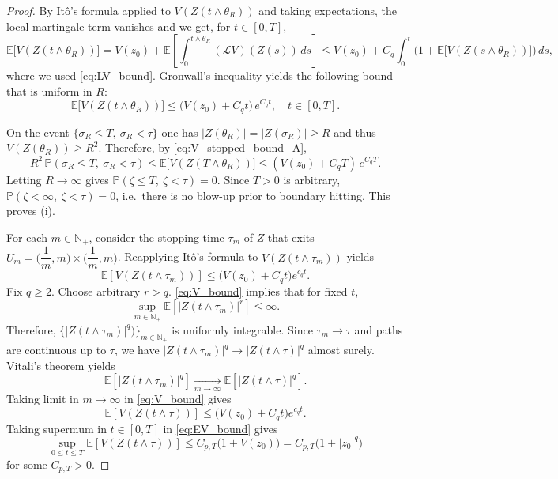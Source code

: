 \documentclass[pdflatex,sn-mathphys-ay]{sn-jnl}
\theoremstyle{thmstyleone}
\theoremstyle{definition}
\theoremstyle{remark}
\begin{document}
\begin{appendices}
\begin{proof}
By It\^{o}'s formula applied to $V(Z(t\wedge \theta_R))$ and taking expectations,
the local martingale term vanishes and we get, for $t\in[0,T]$,
\[
\mathbb{E}\bigl[V(Z(t\wedge \theta_R))\bigr]
=
V(z_0)+\mathbb{E}\!\left[\int_0^{t\wedge \theta_R} (\mathcal{L}V)(Z(s))\,ds\right]
\le
V(z_0)+C_q\int_0^t \Big( 1 +   \mathbb{E}\bigl[V(Z(s\wedge \theta_R))\bigr] \Big)\,ds,
\]
where we used \eqref{eq:LV_bound}.
Gronwall's inequality yields the following bound that is uniform in $R$:
\begin{equation}\label{eq:V_stopped_bound_A}
\mathbb{E}\bigl[V(Z(t\wedge \theta_R))\bigr]
\le
\big(V(z_0) + C_q t \big)\,e^{C_qt}, \quad t\in [0,T].
\end{equation}

On the event $\{\sigma_R\le T,\ \sigma_R<\tau\}$ one has $|Z(\theta_R)|=|Z(\sigma_R)|\ge R$ and thus
$V(Z(\theta_R))\ge R^2$. Therefore, by \eqref{eq:V_stopped_bound_A},
\[
R^2\,\mathbb{P}(\sigma_R\le T,\ \sigma_R<\tau)
\le
\mathbb{E}\bigl[V(Z(T\wedge \theta_R))\bigr]
\le
(V(z_0)+C_qT)\,e^{C_qT}.
\]
Letting $R\to\infty$ gives $\mathbb{P}(\zeta\le T,\ \zeta<\tau)=0$. Since $T>0$ is arbitrary,
$\mathbb{P}(\zeta<\infty,\ \zeta<\tau)=0$, i.e.\ there is no blow-up prior to boundary hitting.
This proves (i).

For each $m\in \mathbb{N}_+$, consider the stopping time $\tau_m$ of $Z$ that exits $U_m = \bigg(\dfrac{1}{m}, m\bigg) \times \bigg( \dfrac{1}{m}, m\bigg)$.
Reapplying It\^o's formula to $V(Z(t\wedge \tau_m))$ yields 
\begin{equation}\label{eq:V_bound}
    \mathbb{E}\left[V(Z(t\wedge \tau_m))\right] \le \big( V(z_0) + C_qt\big) e^{c_qt}.
\end{equation}
Fix $q\ge 2$. Choose arbitrary $r>q$. \eqref{eq:V_bound} implies that for fixed $t$,
\begin{equation*}
    \sup_{m\in \mathbb{N}_+} \mathbb{E}\left[\lvert Z(t\wedge \tau_m)\rvert ^r \right] \le \infty.
\end{equation*}
Therefore, $\{\lvert Z(t\wedge \tau_m)\rvert^q)\}_{m\in \mathbb{N}_+}$ is uniformly integrable. 
Since $\tau_m \to \tau$ and paths are continuous up to $\tau$, we have $\lvert Z(t\wedge \tau_m)\rvert^q \to \lvert Z(t\wedge \tau)\rvert^q$ almost surely. Vitali's theorem yields
\begin{equation*}
    \mathbb{E}\left[\lvert Z(t\wedge \tau_m)\rvert^q \right] \underset{m\to\infty}{\longrightarrow}
    \mathbb{E}\left[\lvert Z(t\wedge \tau)\rvert^q \right].
\end{equation*}
Taking limit in $m\to \infty$ in \eqref{eq:V_bound} gives
\begin{equation}\label{eq:EV_bound}
    \mathbb{E}\left[V(Z(t\wedge \tau))\right] \le \big( V(z_0) + C_qt\big) e^{c_qt}.
\end{equation}
Taking supermum in $t\in [0,T]$ in \eqref{eq:EV_bound} gives
\begin{equation*}
\sup_{0\le t\le T} \mathbb{E}\left[V(Z(t\wedge \tau))\right] \le 
C_{p,T}\big(1+ V(z_0) \big) = C_{p,T}\big(1+ \lvert z_0\rvert^q \big)
\end{equation*}
for some $C_{p,T}>0$.
\end{proof}


\end{appendices}
\end{document}
